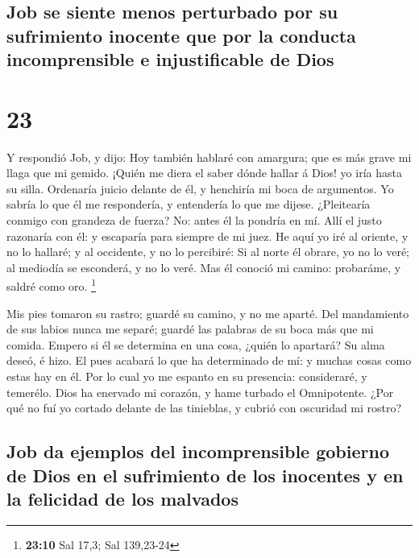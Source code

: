 \hypertarget{job-se-siente-menos-perturbado-por-su-sufrimiento-inocente-que-por-la-conducta-incomprensible-e-injustificable-de-dios}{%
\subsection{Job se siente menos perturbado por su sufrimiento inocente
que por la conducta incomprensible e injustificable de
Dios}\label{job-se-siente-menos-perturbado-por-su-sufrimiento-inocente-que-por-la-conducta-incomprensible-e-injustificable-de-dios}}

\hypertarget{section-22}{%
\section{23}\label{section-22}}

 Y respondió Job, y dijo:  Hoy también hablaré
con amargura; que es más grave mi llaga que mi gemido. 
¡Quién me diera el saber dónde hallar á Dios! yo iría hasta su silla.
 Ordenaría juicio delante de él, y henchiría mi boca de
argumentos.  Yo sabría lo que él me respondería, y
entendería lo que me dijese.  ¿Pleitearía conmigo con
grandeza de fuerza? No: antes él la pondría en mí.  Allí el
justo razonaría con él: y escaparía para siempre de mi juez.
 He aquí yo iré al oriente, y no lo hallaré; y al occidente,
y no lo percibiré:  Si al norte él obrare, yo no lo veré; al
mediodía se esconderá, y no lo veré.  Mas él conoció mi
camino: probaráme, y saldré como oro. \footnote{\textbf{23:10} Sal 17,3;
  Sal 139,23-24}

 Mis pies tomaron su rastro; guardé su camino, y no me
aparté.  Del mandamiento de sus labios nunca me separé;
guardé las palabras de su boca más que mi comida.  Empero
si él se determina en una cosa, ¿quién lo apartará? Su alma deseó, é
hizo.  El pues acabará lo que ha determinado de mí: y
muchas cosas como estas hay en él.  Por lo cual yo me
espanto en su presencia: consideraré, y temerélo.  Dios ha
enervado mi corazón, y hame turbado el Omnipotente.  ¿Por
qué no fuí yo cortado delante de las tinieblas, y cubrió con oscuridad
mi rostro?

\hypertarget{job-da-ejemplos-del-incomprensible-gobierno-de-dios-en-el-sufrimiento-de-los-inocentes-y-en-la-felicidad-de-los-malvados}{%
\subsection{Job da ejemplos del incomprensible gobierno de Dios en el
sufrimiento de los inocentes y en la felicidad de los
malvados}\label{job-da-ejemplos-del-incomprensible-gobierno-de-dios-en-el-sufrimiento-de-los-inocentes-y-en-la-felicidad-de-los-malvados}}

